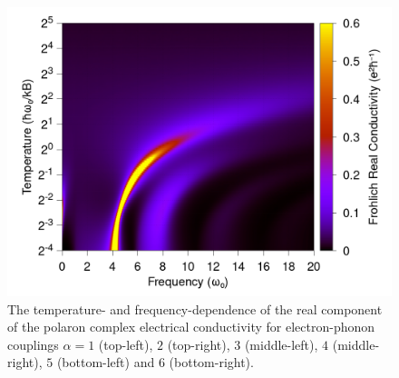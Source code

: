 \begin{figure}[t]
    \includegraphics[width=.49\textwidth]{figures/frohlich-3d-real-conductivity-alpha-6-temp-00625to32-freq-0to30-contourf.png}

    \caption{The temperature- and frequency-dependence of the real component of the polaron complex electrical conductivity for electron-phonon couplings $\alpha = 1$ (top-left), $2$ (top-right), $3$ (middle-left), $4$ (middle-right), $5$ (bottom-left) and $6$ (bottom-right).}
    \label{fig:osakacontour}
\end{figure}
\FloatBarrier  

